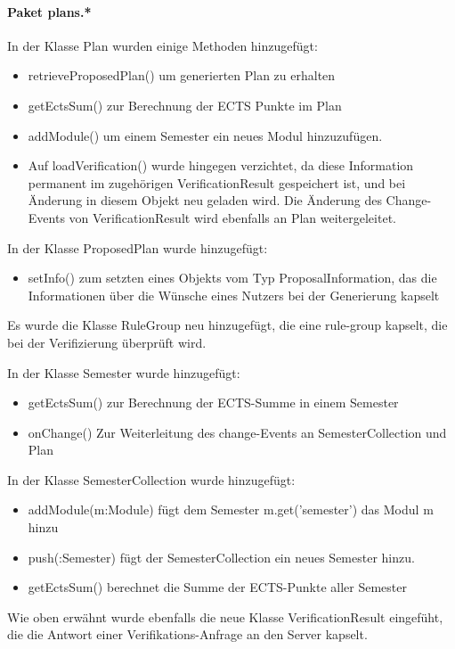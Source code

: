 \paragraph{Paket plans.*}
In der Klasse Plan wurden einige Methoden hinzugefügt:
\begin{itemize}
	\item retrieveProposedPlan() um generierten Plan zu erhalten
	\item getEctsSum() zur Berechnung der ECTS Punkte im Plan
	\item addModule() um einem Semester ein neues Modul hinzuzufügen.
	\item Auf loadVerification() wurde hingegen verzichtet, da diese Information permanent im zugehörigen VerificationResult gespeichert ist, und bei Änderung in diesem Objekt neu geladen wird. Die Änderung des Change-Events von VerificationResult wird ebenfalls an Plan weitergeleitet.
\end{itemize}

In der Klasse ProposedPlan wurde hinzugefügt:
\begin{itemize}
	\item setInfo() zum setzten eines Objekts vom Typ ProposalInformation, das die Informationen über die Wünsche eines Nutzers bei der Generierung kapselt
\end{itemize}

Es wurde die Klasse RuleGroup neu hinzugefügt, die eine rule-group kapselt, die bei der Verifizierung überprüft wird.

In der Klasse Semester wurde hinzugefügt:
\begin{itemize}
	\item getEctsSum() zur Berechnung der ECTS-Summe in einem Semester
	\item onChange() Zur Weiterleitung des \glqq change\grqq-Events an SemesterCollection und Plan
\end{itemize}

In der Klasse SemesterCollection wurde hinzugefügt:
\begin{itemize}
	\item addModule(m:Module) fügt dem Semester m.get('semester') das Modul m hinzu
	\item push(:Semester) fügt der SemesterCollection ein neues Semester hinzu.
	\item getEctsSum() berechnet die Summe der ECTS-Punkte aller Semester
\end{itemize}

Wie oben erwähnt wurde ebenfalls die neue Klasse VerificationResult eingefüht, die die Antwort einer Verifikations-Anfrage an den Server kapselt.